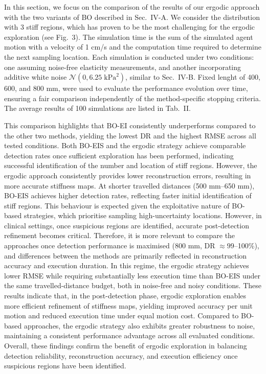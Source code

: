 \documentclass[11pt]{article}
\begin{document}
In this section, we focus on the comparison of the results of our
ergodic approach with the two variants of BO described in Sec.~IV-A.
We consider the distribution with 3 stiff regions, which has proven
to be the most challenging for the ergodic exploration (see Fig.~3).
The simulation time is the sum of the simulated agent motion with a
velocity of 1 cm/s and the computation time required to determine
the next sampling location. Each simulation is conducted under two
conditions: one assuming noise-free elasticity measurements, and
another incorporating additive white noise
$\mathcal{N}(0, 6.25\;\mathrm{kPa}^{2})$, similar to Sec.~IV-B. Fixed
lenght of 400, 600, and 800 mm, were used to evaluate the performance
evolution over time, ensuring a fair comparison independently of the
method-specific stopping criteria. The average results of 100
simulations are listed in Tab.~II.

This comparison highlights that BO-EI consistently underperforms
compared to the other two methods, yielding the lowest DR and the
highest RMSE across all tested conditions. Both BO-EIS and the
ergodic strategy achieve comparable detection rates once sufficient
exploration has been performed, indicating successful identification
of the number and location of stiff regions. However, the ergodic
approach consistently provides lower reconstruction errors,
resulting in more accurate stiffness maps. At shorter travelled
distances (500 mm--650 mm), BO-EIS achieves higher detection rates,
reflecting faster initial identification of stiff regions. This
behaviour is expected given the exploitative nature of BO-based
strategies, which prioritise sampling high-uncertainty locations.
However, in clinical settings, once suspicious regions are
identified, accurate post-detection refinement becomes critical.
Therefore, it is more relevant to compare the approaches once
detection performance is maximised (800 mm, DR $\approx 99$--100\%),
and differences between the methods are primarily reflected in
reconstruction accuracy and execution duration. In this regime, the
ergodic strategy achieves lower RMSE while requiring substantially
less execution time than BO-EIS under the same travelled-distance
budget, both in noise-free and noisy conditions. These results
indicate that, in the post-detection phase, ergodic exploration
enables more efficient refinement of stiffness maps, yielding
improved accuracy per unit motion and reduced execution time under
equal motion cost. Compared to BO-based approaches, the ergodic
strategy also exhibits greater robustness to noise, maintaining a
consistent performance advantage across all evaluated conditions.
Overall, these findings confirm the benefit of ergodic exploration
in balancing detection reliability, reconstruction accuracy, and
execution efficiency once suspicious regions have been identified.
\end{document}
